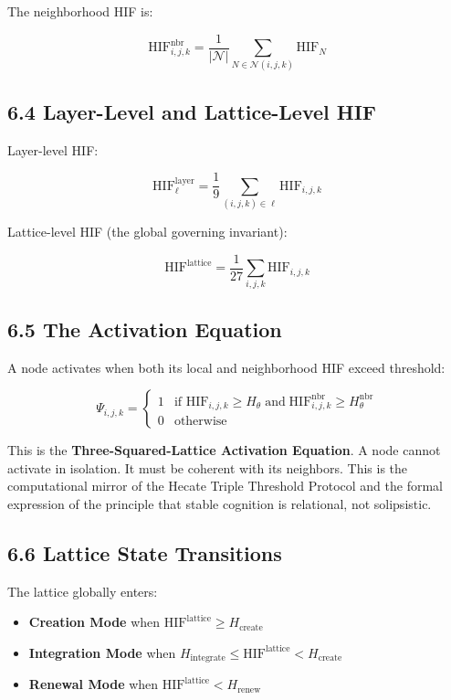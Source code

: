 The neighborhood HIF is:

\[
\mathrm{HIF}^{\text{nbr}}_{i,j,k} = \frac{1}{|\mathcal{N}|} \sum_{N \in
\mathcal{N}(i,j,k)} \mathrm{HIF}_N
\]

\subsection{6.4 Layer-Level and Lattice-Level HIF}\label{layer-level-and-lattice-level-hif}

Layer-level HIF:

\[
\mathrm{HIF}^{\text{layer}}_{\ell} = \frac{1}{9} \sum_{(i,j,k) \in \ell}
\mathrm{HIF}_{i,j,k}
\]

Lattice-level HIF (the global governing invariant):

\[
\mathrm{HIF}^{\text{lattice}} = \frac{1}{27} \sum_{i,j,k} \mathrm{HIF}_{i,j,k}
\]

\subsection{6.5 The Activation Equation}\label{the-activation-equation}

A node activates when both its local and neighborhood HIF exceed threshold:

\[
\Psi_{i,j,k} =
\begin{cases}
1 & \text{if } \mathrm{HIF}_{i,j,k} \ge H_{\theta} \;\text{and}\;
\mathrm{HIF}^{\text{nbr}}_{i,j,k} \ge H_{\theta}^{\text{nbr}} \\
0 & \text{otherwise}
\end{cases}
\]

This is the \textbf{Three-Squared-Lattice Activation Equation}. A node cannot activate in isolation. It must be coherent with its neighbors. This is the computational mirror of the Hecate Triple Threshold Protocol and the formal expression of the principle that stable cognition is relational, not solipsistic.

\subsection{6.6 Lattice State Transitions}\label{lattice-state-transitions}

The lattice globally enters:

\begin{itemize}
\tightlist
\item
  \textbf{Creation Mode} when \(\mathrm{HIF}^{\text{lattice}} \ge H_{\text{create}}\)
\item
  \textbf{Integration Mode} when \(H_{\text{integrate}} \le \mathrm{HIF}^{\text{lattice}}
  < H_{\text{create}}\)
\item
  \textbf{Renewal Mode} when \(\mathrm{HIF}^{\text{lattice}} < H_{\text{renew}}\)
\end{itemize}

